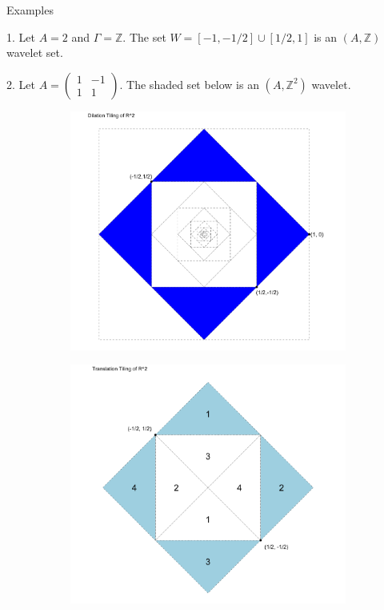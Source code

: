 \documentclass{sintefbeamer}
\newcommand{\Z}{{\mathbb {Z}}}
\begin{document}
\begin{frame}{Examples}

1. Let $A = 2$ and $\Gamma = \Z$. The set $W = [-1, -1/2] \cup [1/2, 1]$ is an $(A, \Z)$ wavelet set.

\pause

2. Let $A = \begin{pmatrix}
    1&-1\\1&1
\end{pmatrix}$. The shaded set below is an $(A, \Z^2)$ wavelet.

\begin{figure}[h]

\begin{subfigure}{0.45\textwidth}
\includegraphics[width=0.9\linewidth, scale = 0.5]{images/wavelet_set_9.png} 
\end{subfigure}
\begin{subfigure}{0.45\textwidth}
\includegraphics[width=0.9\linewidth, scale = 0.5]{images/wavelet_set_10.png}
\end{subfigure}
\end{figure}

\end{frame}
\end{document}
